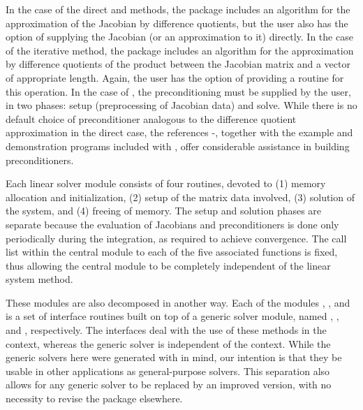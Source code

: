 In the case of the direct {\cvdense} and {\cvband} methods, the package includes
an algorithm for the approximation of the Jacobian by difference
quotients, but the user also has the option of supplying the Jacobian
(or an approximation to it) directly. In the case of the iterative
{\cvspgmr} method, the package includes an algorithm for the approximation
by difference quotients of the product between the Jacobian matrix and
a vector of appropriate length. Again, the user has the option of providing
a routine for this operation.
In  the case of {\cvspgmr}, 
the preconditioning must be supplied by the user, in two phases: 
setup (preprocessing of Jacobian data) and solve.
While there is no default
choice of preconditioner analogous to the difference quotient
approximation in the direct case, the references
\cite{BrHi:89}-\cite{Byr:92}, together with
the example and demonstration programs included with {\cvodes}, offer
considerable assistance in building preconditioners.

Each {\cvodes} linear solver module consists of four routines, devoted to (1)
memory allocation and initialization, (2) setup of the matrix data
involved, (3) solution of the system, and (4) freeing of memory.  
The setup and solution phases are separate because the evaluation of
Jacobians and preconditioners is done only periodically during the
integration, as required to achieve convergence. The call list within
the central {\cvodes} module to each of the five associated functions is
fixed, thus allowing the central module to be completely independent
of the linear system method.

These modules are also decomposed in another way.
Each of the modules {\cvdense}, {\cvband}, and {\cvspgmr} is a set of 
interface routines built on top of a generic solver module, 
named {\dense}, {\band}, and {\spgmr}, respectively.  
The interfaces deal with the use of these methods in the {\cvodes} context, 
whereas the generic solver is independent of the context.
While the generic solvers here were generated with {\sundials} in mind, our
intention is that they be usable in other applications as
general-purpose solvers.  This separation also allows for any generic
solver to be replaced by an improved version, with no necessity to
revise the {\cvodes} package elsewhere.

